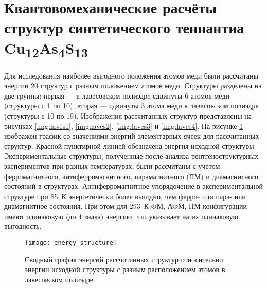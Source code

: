 \section{Квантовомеханические расчёты структур синтетического теннантиа Cu\textsubscript{12}As\textsubscript{4}S\textsubscript{13}} \label{sect3_4}

Для исследования наиболее выгодного положения атомов меди были рассчитаны энергии 20 структур с разным положением атомов меди.
Структуры разделены на две группы: первая --- в лавесовском полиэдре сдвинуты 6 атомов меди (структуры с 1 по 10), вторая --- сдвинуты 3 атома меди в лавесовском полиэдре (структуры с 10 по 19). Изображения рассчитанных структур представлены на рисунках \ref{img:laves1}, \ref{img:laves2}, \ref{img:laves3} и \ref{img:laves4}.
На рисунке \ref{img:th} изображен график со значениями энергий элементарных ячеек для рассчитанных структур. Красной пунктирной линией обозначена энергия исходной структуры.
Экспериментальные структуры, полученные после анализа рентгеноструктурных экспериментов при разных температурах, были рассчитаны с учетом ферромагнитного, антиферромагнитного, парамагнитного (ПМ) и диамагнитного состояний в структурах.
Антиферромагнитное упорядочение в экспериментальной структуре при 85~К энергетически более выгодно, чем ферро- или пара- или диамагнитное состояния. При этом для 293~К ФМ, АФМ, ПМ конфигурации имеют одинаковую (до 4 знака) энергию, что указывает на их одинаковую выгодность.

\begin{figure}[ht!]
  \begin{minipage}[ht]{0.9\linewidth}\centering
    \texttt{[image: energy\_structure]}
  \end{minipage}

      \caption[Сводный график энергий рассчитанных структур относительно энергии исходной структуры с разным расположением атомов в лавесовском полиэдре]{Сводный график энергий рассчитанных структур относительно энергии исходной структуры с разным расположением атомов в лавесовском полиэдре}
    \label{img:th}
\end{figure}

